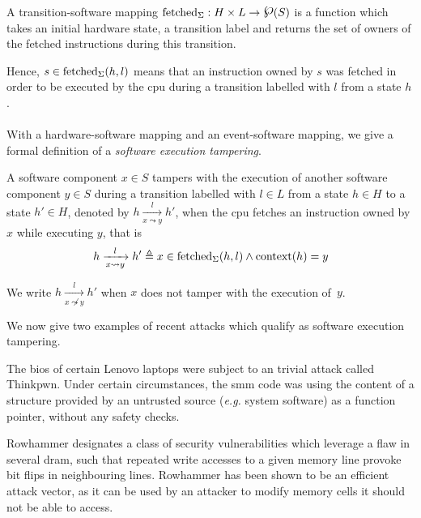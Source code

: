 \begin{definition}
  \label{def:minx86:transsoft}
  A transition-software mapping
  $\func{fetched}_{\Sigma}: H \times L \rightarrow \powerset(S)$ is a function
  which takes an initial hardware state, a transition label and returns the set
  of owners of the fetched instructions during this transition.
\end{definition}

Hence, $s \in \mathrm{fetched}_{\Sigma}(h, l)$ means that an instruction owned by
$s$ was fetched in order to be executed by the \ac{cpu} during a transition
labelled with $l$ from a state $h$.

\paragraph{}
%
With a hardware-software mapping and an event-software mapping, we give a formal
definition of a \textit{software execution tampering}.

\begin{definition}
  \label{def:codeinjection}
  A software component $x \in S$ tampers with the execution of another software
  component $y \in S$ during a transition labelled with $l \in L$ from a state
  $h \in H$ to a state $h' \in H$, denoted by
  $h \xrightarrow[x \leadsto y]{l} h'$, when the \ac{cpu} fetches an instruction
  owned by $x$ while executing $y$, that is
  \[
    h \xrightarrow[x \leadsto y]{l} h' \triangleq x \in
    \mathrm{fetched}_{\Sigma}(h, l) \wedge \mathrm{context}(h) = y
  \]

  We write $h \xrightarrow[x \not\leadsto y]{l} h'$ when $x$ does not tamper
  with the execution of~$y$.
\end{definition}

We now give two examples of recent attacks which qualify as software execution
tampering.

\begin{example}[Thinkpwn]
  The \ac{bios} of certain Lenovo laptops were subject to an trivial attack
  called Thinkpwn.
  Under certain circumstances, the \ac{smm} code was using the content of a
  structure provided by an untrusted source (\emph{e.g.} system software) as a
  function pointer, without any safety checks.
\end{example}

\begin{example}[Rowhammer]
  Rowhammer designates a class of security vulnerabilities which leverage a flaw
  in several \ac{dram}, such that repeated write accesses to a given memory line
  provoke bit flips in neighbouring lines.
  Rowhammer has been shown to be an efficient attack vector, as it can be used
  by an attacker to modify memory cells it should not be able to access.
\end{example}


